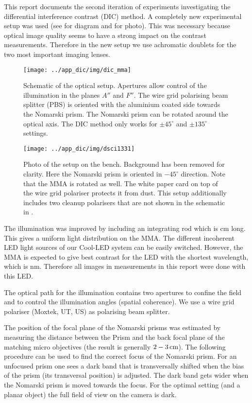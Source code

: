 This report documents the second iteration of experiments
investigating the differential interference contrast (DIC) method. A
completely new experimental setup was used (see 
for diagram and  for photo). This was necessary
because optical image quality seems to have a strong impact on the
contrast measurements. Therefore in the new setup we use achromatic
doublets for the two most important imaging lenses.
\begin{figure}[ht]
  \centering
  \texttt{[image: ../app\_dic/img/dic\_mma]}
  \caption{ Schematic of the optical setup. Apertures allow control of
    the illumination in the planes $A''$ and $F''$. The wire grid
    polarising beam splitter (PBS) is oriented with the aluminium
    coated side towards the Nomarski prism. The Nomarski prism can be
    rotated around the optical axis. The DIC method only works for
    $\pm 45^\circ$ and $\pm 135^\circ$ settings. }
  \label{fig:dic_mma}
\end{figure}
\newpage
\begin{figure}[ht]
  \centering
  \texttt{[image: ../app\_dic/img/dsci1331]}

  \caption{ Photo of the setup on the bench. Background has been
    removed for clarity. Here the Nomarski prism is oriented in
    $-45^\circ$ direction. Note that the MMA is rotated as well. The
    white paper card on top of the wire grid polariser protects it from
    dust.  This setup additionally includes two cleanup polarisers
    that are not shown in the schematic in .}
  \label{fig:dic_photo}
\end{figure}

The illumination was improved by including an integrating rod which is
\unit[10]{cm} long. This gives a uniform light distribution on the
MMA.  The different incoherent LED light sources of our Cool-LED system
can be easily switched. However, the MMA is expected to give best
contrast for the LED with the shortest wavelength, which is
\unit[480]{nm}. Therefore all images in measurements in this report
were done with this LED.

The optical path for the illumination contains two apertures to
confine the field and to control the illumination angles (spatial
coherence).  We use a wire grid polariser (Moxtek, UT, US) as
polarising beam splitter.

The position of the focal plane of the Nomarski prisms was estimated
by measuring the distance between the Prism and the back focal plane
of the matching micro objectives (the result is generally
$\unit[2-3]{cm}$). The following procedure can be used to find the
correct focus of the Nomarski prism. For an unfocused prism one sees a
dark band that is transversally shifted when the bias of the prism
(its transversal position) is adjusted. The dark band gets wider when
the Nomarski prism is moved towards the focus. For the optimal setting
(and a planar object) the full field of view on the camera is dark.


